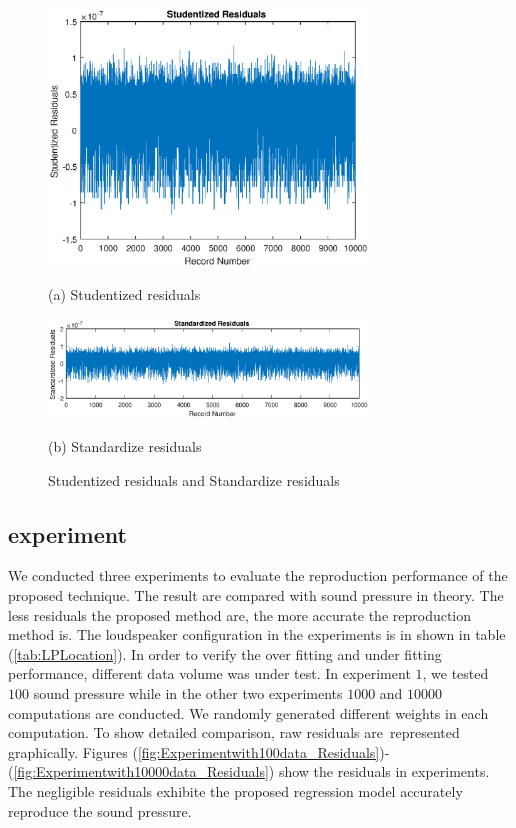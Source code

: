 \documentclass[runningheads,a4paper]{llncs}
\begin{document}
  \begin{figure}[bth]
    \begin{minipage}{0.28\linewidth}
      \centerline{\includegraphics[width=8.5cm]{Residuals_Studentized.eps}}
      \centerline{(a) Studentized residuals}
    \end{minipage}
    \hfill
    \begin{minipage}{.28\linewidth}
      \centerline{\includegraphics[width=8.5cm]{Residuals_Standardize.eps}}
      \centerline{(b) Standardize residuals}
    \end{minipage}
    \caption{Studentized residuals and Standardize residuals}
    \label{fig:ssResiduals}
  \end{figure}

\subsection{experiment}
We conducted three experiments to evaluate the reproduction performance of the proposed technique. The result are compared with sound pressure in theory. The less residuals the proposed method are, the more accurate the reproduction method is. The loudspeaker configuration in the experiments is in shown in  table (\ref{tab:LPLocation}). In order to verify the over fitting and under fitting performance, different data volume was under test. In experiment $1$, we tested $100$ sound pressure while in the other two experiments $1000$ and $10000$ computations are conducted. We randomly generated different weights in each computation. To show detailed comparison, raw residuals are represented graphically. Figures (\ref{fig:Experimentwith100data_Residuals})-(\ref{fig:Experimentwith10000data_Residuals}) show the residuals in experiments. The negligible residuals exhibite the proposed regression model accurately reproduce the sound pressure.
\end{document}
